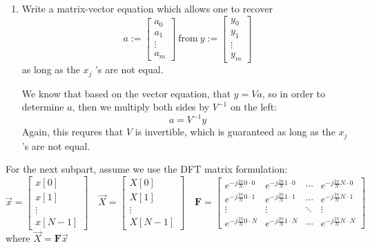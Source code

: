 \documentclass[10pt]{article}
\begin{document}
	\begin{enumerate}[label=\alph*), resume]
		\item Write a matrix-vector equation which allows one to recover
			\[
				a := \begin{bmatrix} a_0\\a_1\\ \vdots \\ a_m \end{bmatrix} 
				\ \text{from} \ y:= \begin{bmatrix} y_0\\y_1\\ \vdots \\ y_m \end{bmatrix} 
			\] 
			 as long as the  \( x_j \) 's are not equal. 

			 \begin{solution}
				We know that based on the vector equation, that \( y = Va \), so in order to determine \( a \), 
				then we multiply both sides by \( V^{-1} \) on the left:
				\[
				a = V^{-1} y
				\] 
				Again, this requres that \( V \) is invertible, which is guaranteed as long as the \( x_j \)'s are 
				not equal.
			 \end{solution}
	\end{enumerate}
	For the next subpart, assume we use the DFT matrix formulation:
	\[
		\vec x = \begin{bmatrix} x[0]\\x[1]\\ \vdots \\x[N-1] \end{bmatrix} \quad 
		\vec X = \begin{bmatrix} X[0] \\ X[1] \\ \vdots \\ X[N-1] \end{bmatrix} \quad
		\mathbf F = \begin{bmatrix} e^{-j \frac{2\pi}{N} 0 \cdot 0} & e^{-j \frac{2\pi}{N} 1 \cdot 0 }
		& \cdots & e^{-j \frac{2\pi}{N}N \cdot 0}\\ e^{-j \frac{2\pi}{N} 0 \cdot 1} & 
		e^{-j \frac{2\pi}{N} 1 \cdot 1} & \cdots & e^{-j \frac{2\pi}{N}N \cdot 1}\\
	\vdots & \vdots & \ddots & \vdots \\
	e^{-j \frac{2\pi}{N} 0 \cdot N} & e^{-j \frac{2\pi}{N} 1 \cdot N} & \cdots & e^{-j \frac{2\pi}{N}N \cdot N}
	\end{bmatrix} 
	\] 
	where \( \vec X = \mathbf F \vec x \)
\end{document}
